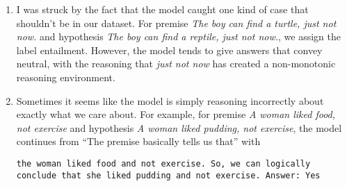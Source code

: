 \documentclass[11pt]{article}
\newcommand{\mynewline}{{\color{gray}{\textbackslash n\\}}}
\newcommand{\word}[1]{\emph{#1}}
\begin{document}
\begin{enumerate}
\item I was struck by the fact that the model caught one kind of case
  that shouldn't be in our dataset. For premise \word{The boy can find
    a turtle, just not now.} and hypothesis \word{The boy can find a
    reptile, just not now.}, we assign the label entailment. However,
  the model tends to give answers that convey neutral, with the
  reasoning that \word{just not now} has created a non-monotonic
  reasoning environment.

\item Sometimes it seems like the model is simply reasoning
  incorrectly about exactly what we care about.
  For example, for premise \word{A woman liked food, not exercise}
  and hypothesis \word{A woman liked pudding, not exercise},
  the model continues from ``The
  premise basically tells us that'' with

  \texttt{the woman liked food and not exercise. So, we can logically
    conclude that she liked pudding and not exercise.\mynewline
    Answer: Yes}


\end{enumerate}

\end{document}
